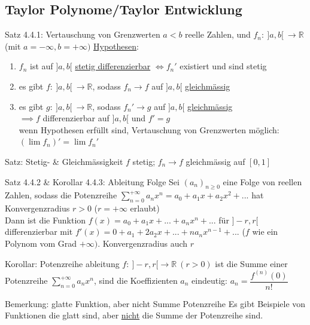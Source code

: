 \documentclass[a4paper,10pt]{article}
\begin{document}
\subsection{Taylor Polynome/Taylor Entwicklung}
    \begin{tbox}
        {Satz 4.4.1: Vertauschung von Grenzwerten}
        $a<b$ reelle Zahlen, und $f_n:\ ]a,b[\ \longrightarrow \mathbb R$ (mit $a=-\infty, b=+\infty)$
        \underline{Hypothesen}:
        \begin{enumerate}
            \item $f_n$ ist auf $]a,b[$ \underline{stetig differenzierbar} $\iff f_n'$ existiert und sind stetig
            \item es gibt $f:\ ]a,b[\ \longrightarrow \mathbb R$, sodass $f_n\longrightarrow f$ auf $]a,b[$ \underline{gleichmässig}
            \item es gibt $g:\ ]a,b[\ \longrightarrow\mathbb R$, sodass $f_n'\longrightarrow g$ auf $]a,b[$ \underline{gleichmässig}
            \\ $\implies f$ differenzierbar auf $]a,b[$ und $f'=g$
            \\ wenn Hypothesen erfüllt sind, Vertauschung von Grenzwerten möglich: $(\lim f_n)'= \lim f_n'$
        \end{enumerate}
    \end{tbox}
\begin{tbox}
    {Satz: Stetig- \& Gleichmässigkeit}
    $f$ stetig; $f_n\longrightarrow f$ gleichmässig auf $[0,1]$
\end{tbox}
\begin{tbox}
    {Satz 4.4.2 \& Korollar 4.4.3: Ableitung Folge}
    Sei $(a_n)_{n\ge 0}$ eine Folge von reellen Zahlen, sodass die Potenzreihe $\sum_{n=0}^{+\infty}a_n x^n= a_0+a_1x+a_2x^2+...$ hat Konvergenzradius $r>0$ ($r=+\infty$ erlaubt)
    \\ Dann ist die Funktion $f(x)=a_0+a_1x+...+a_nx^n+...$ für $]-r,r[$ differenzierbar mit $f'(x)=0+a_1+2a_2x+...+na_nx^{n-1}+...$ ($f$ wie ein Polynom vom Grad $+\infty)$. Konvergenzradius auch $r$
\end{tbox}
\begin{tbox}
    {Korollar: Potenzreihe ableitung}
    $f:\ ]-r,r[\longrightarrow \mathbb R \ (r>0)$ ist die Summe einer Potenzreihe $\sum_{n=0}^{+\infty}a_nx^n$, sind die Koeffizienten $a_n$ eindeutig: $a_n=\dfrac{f^{(n)}(0)}{n!}$
\end{tbox}
\begin{bembox}
    {Bemerkung: glatte Funktion, aber nicht Summe Potenzreihe}
    Es gibt Beispiele von Funktionen die glatt sind, aber \underline{nicht} die Summe der Potenzreihe sind.
\end{bembox}
\end{document}

